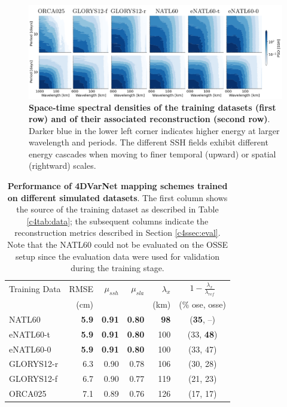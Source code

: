 \begin{bibunit}
\begin{figure}[H]
\small
\begin{center}
\includegraphics[width=\linewidth]{./00_Simulearning/standalone_figures/st_psd.png}
\end{center}

\caption{
\textbf{Space-time spectral densities of the training datasets (first row) and of their associated reconstruction (second row)}. Darker blue in the lower left corner indicates higher energy at larger wavelength and periods. The different SSH fields exhibit different energy cascades when moving to  finer temporal (upward) or spatial (rightward) scales.} \vspace{-5mm}
\label{c4fig:spacetime_psd}
\end{figure}






\begin{table}[H]
\centering
\begin{tabular}{l||rrrrc}
\toprule
Training Data & RMSE  & $\mu_{ssh}$  & $\mu_{sla}$ & $\lambda_x$ & $1 - \frac{\lambda_x}{\lambda_{ref}}$ \\
 &  (cm) &   &   &  (km) & (\% ose, osse) \\
\midrule
NATL60 & \textbf{5.9}  & \textbf{0.91}  & \textbf{0.80}  & \textbf{98} & (\textbf{35}, --)\\
eNATL60-t & \textbf{5.9}  & \textbf{0.91}  & \textbf{0.80}  & 100 & (33, \textbf{48})\\
eNATL60-0 & \textbf{5.9}  & \textbf{0.91}  & \textbf{0.80}  & 100 & (33, 47)\\
GLORYS12-r & 6.3  & 0.90  & 0.78  & 106  & (30, 28)\\
GLORYS12-f & 6.7  & 0.90  & 0.77  & 119 & (21, 23)\\
ORCA025 & 7.1  & 0.89  & 0.76  & 126 & (17, 17)\\
\bottomrule
\end{tabular}

\caption{\textbf{Performance of 4DVarNet mapping schemes trained on different simulated datasets}. The first column shows the source of the training dataset as described in Table \ref{c4tab:data}; the subsequent columns indicate the reconstruction metrics described in Section \ref{c4ssec:eval}. Note that the NATL60 could not be evaluated on the OSSE setup since the evaluation data were used for validation during the training stage.}
\label{c4tab:res}
\end{table}


\end{bibunit}
